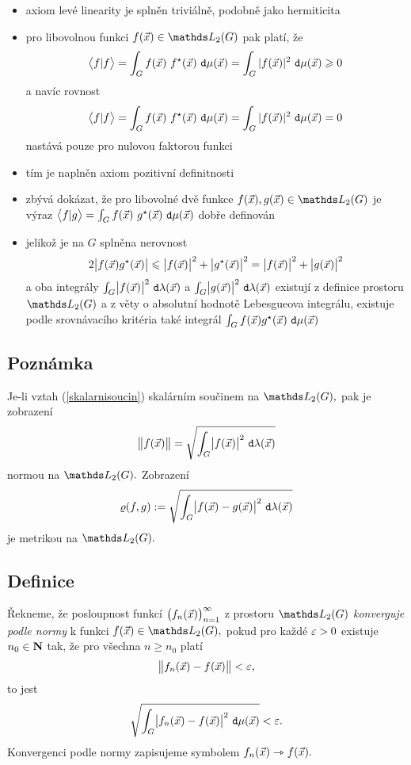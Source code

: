 \begin{itemize}
\item axiom lev\'e linearity je spln\v en trivi\'aln\v e, podobn\v e jako hermiticita
\item pro libovolnou funkci  $f(\x)\in \LL_2(G)$ pak plat\'i, \v ze
%
$$\bigl\langle f|f \bigr\rangle=\int_{G} f({\vec{x}})~f^\star({\vec{x}})~\mathtt{d}\mu({\vec{x}})=\int_{G} |f({\vec{x}})|^2~\mathtt{d}\mu({\vec{x}}) \geqslant 0$$
%
a nav\'ic rovnost
%
$$\bigl\langle f|f \bigr\rangle=\int_{G} f({\vec{x}})~f^\star({\vec{x}})~\mathtt{d}\mu({\vec{x}})=\int_{G} |f({\vec{x}})|^2~\mathtt{d}\mu({\vec{x}}) = 0$$
%
nast\'av\'a pouze pro nulovou faktorou funkci
\item t\'im je napln\v en axiom pozitivn\'i definitnosti
\item zb\'yv\'a dok\'azat, \v ze pro libovoln\'e dv\v e funkce  $f(\x),g(\x)\in \LL_2(G)$ je v\'yraz $\bigl\langle f|g \bigr\rangle=\int_{G} f({\vec{x}})~g^\star({\vec{x}})~\mathtt{d}\mu({\vec{x}})$ dob\v re definov\'an
\item jeliko\v z je na $G$ spln\v ena nerovnost $$2\bigl|f({\vec{x}})g^\star({\vec{x}})\bigr|\leqslant \bigl|f({\vec{x}})\bigr|^2+\bigl|g^\star({\vec{x}})\bigr|^2=\bigl|f({\vec{x}})\bigr|^2+\bigl|g({\vec{x}})\bigr|^2$$ a oba integr\'aly $\int_{G} \bigl|f({\vec{x}})\bigr|^2~\mathtt{d}\lambda({\vec{x}})$ a $\int_{G} \bigl|g({\vec{x}})\bigr|^2~\mathtt{d}\lambda({\vec{x}})$ existuj\'i z definice prostoru $\LL_2(G)$ a z v\v ety o absolutn\'i hodnot\v e Lebesgueova integr\'alu, existuje podle srovn\'avac\'iho krit\'eria tak\'e integr\'al $\int_{G} f({\vec{x}})g^\star({\vec{x}})~\mathtt{d}\mu({\vec{x}})$

\end{itemize}


\subsection{Pozn\'amka}

Je-li vztah (\ref{skalarnisoucin}) skal\'arn\'im sou\v cinem na $\LL_2(G),$ pak je zobrazen\'i
%
$$\bigl\|f({\vec{x}})\bigr\|=\sqrt{\int_G \bigl|f({\vec{x}})\bigr|^2~\mathtt{d}\lambda({\vec{x}})}$$
%
normou na $\LL_2(G).$  Zobrazen\'i 
%
$$\varrho(f,g):=\sqrt{\int_G \bigl|f({\vec{x}})-g({\vec{x}})\bigr|^2 ~\mathtt{d}\lambda({\vec{x}})}$$
%
 je metrikou na $\LL_2(G).$

\subsection{Definice}

\v Rekneme, \v ze posloupnost funkc\'i $\bigl(f_n({\vec{x}})\bigr)_{n=1}^\infty$ z prostoru $\LL_2(G)$ \emph{konverguje podle normy} k funkci $f(\x)\in\LL_2(G),$ pokud pro ka\v zd\'e $\varepsilon>0$ existuje $n_0\in{\mathbf N}$ tak, \v ze pro v\v sechna $n\geq n_0$ plat\'i
%
$$\bigl\|f_n({\vec{x}})-f({\vec{x}})\bigr\|<\varepsilon,$$
%
to jest
%
$$\sqrt{\int_G \bigl|f_n({\vec{x}})-f({\vec{x}})\bigr|^2 ~\mathtt{d}\mu({\vec{x}})}<\varepsilon.$$
%
Konvergenci podle normy zapisujeme symbolem $f_n({\vec{x}}) \rightarrowtriangle f({\vec{x}}).$



